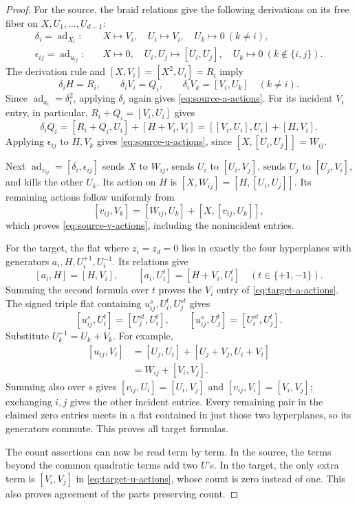 \documentclass[11pt]{article}
\theoremstyle{definition}
\theoremstyle{remark}
\numberwithin{equation}{section}
\begin{document}
\begin{proof}
For the source, the braid relations give the following derivations
on its free fiber on $X,U_1,\ldots,U_{d-1}$:
\[
 \begin{aligned}
 \delta_i=\operatorname{ad}_{X_i}:&\quad
 X\longmapsto V_i,\quad U_i\longmapsto V_i,\quad
 U_k\longmapsto0\ (k\ne i),\\
 \epsilon_{ij}=\operatorname{ad}_{u_{ij}}:&\quad
 X\longmapsto0,\quad U_i,U_j\longmapsto[U_i,U_j],\quad
 U_k\longmapsto0\ (k\notin\{i,j\}).
 \end{aligned}
\]
The derivation rule and $[X,V_i]=[X^2,U_i]=R_i$ imply
\[
 \delta_iH=R_i,\qquad \delta_iV_i=Q_i,\qquad
 \delta_iV_k=[V_i,U_k]\quad(k\ne i).
\]
Since $\operatorname{ad}_{a_i}=\delta_i^2$, applying $\delta_i$ again gives
\eqref{eq:source-a-actions}.  For its incident $V_i$ entry, in
particular, $R_i+Q_i=[V_i,U_i]$ gives
\[
 \delta_iQ_i=[R_i+Q_i,U_i]+[H+V_i,V_i]
 =[ [V_i,U_i],U_i]+[H,V_i].
\]
Applying $\epsilon_{ij}$ to $H,V_k$ gives
\eqref{eq:source-u-actions}, since
$[X,[U_i,U_j]]=W_{ij}$.

Next $\operatorname{ad}_{v_{ij}}=[\delta_i,\epsilon_{ij}]$ sends $X$ to $W_{ij}$,
sends $U_i$ to $[U_i,V_j]$, sends $U_j$ to $[U_j,V_i]$, and kills the
other $U_k$.  Its action on $H$ is
$[X,W_{ij}]=[H,[U_i,U_j]]$.  Its remaining actions follow uniformly
from
\[
 [v_{ij},V_k]=[W_{ij},U_k]+[X,[v_{ij},U_k]],
\]
which proves \eqref{eq:source-v-actions}, including the nonincident
entries.

For the target, the flat where $z_i=z_d=0$ lies in exactly the four
hyperplanes with generators $a_i,H,U_i^{+1},U_i^{-1}$.  Its relations give
\[
 [a_i,H]=[H,V_i],\qquad
 [a_i,U_i^t]=[H+V_i,U_i^t]\quad(t\in\{+1,-1\}).
\]
Summing the second formula over $t$ proves the $V_i$ entry of
\eqref{eq:target-a-actions}.  The signed triple flat containing
$u_{ij}^s,U_i^t,U_j^{st}$ gives
\[
 [u_{ij}^s,U_i^t]=[U_j^{st},U_i^t],\qquad
 [u_{ij}^s,U_j^t]=[U_i^{st},U_j^t].
\]
Substitute $U_k^{-1}=U_k+V_k$.  For example,
\[
 \begin{aligned}
 [u_{ij},V_i]
 &=[U_j,U_i]+[U_j+V_j,U_i+V_i]\\
 &=W_{ij}+[V_i,V_j].
 \end{aligned}
\]
Summing also over $s$ gives
$[v_{ij},U_i]=[U_i,V_j]$ and
$[v_{ij},V_i]=[V_i,V_j]$; exchanging $i,j$ gives the other incident
entries.  Every remaining pair in the claimed zero entries meets
in a flat contained in just those two hyperplanes, so its generators
commute.  This proves all target formulas.

The count assertions can now be read term by term.  In the source,
the terms beyond the common quadratic terms add two $U$'s.  In the
target, the only extra term is $[V_i,V_j]$ in
\eqref{eq:target-u-actions}, whose count is zero instead of one.
This also proves agreement of the parts preserving count.
\end{proof}
\end{document}
